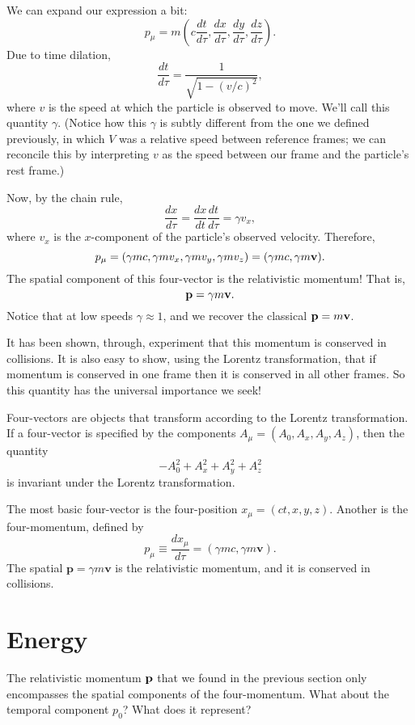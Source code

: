 \documentclass[../p023main.tex]{subfiles}
\begin{document}
We can expand our expression a bit:
\[ p_\mu = m \left( c \frac{dt}{d\tau}, \frac{dx}{d\tau}, \frac{dy}{d\tau}, \frac{dz}{d\tau} \right). \]
Due to time dilation,
\[ \frac{dt}{d\tau} = \frac{1}{\sqrt{1 - \left( v / c \right)^2}}, \]
where $v$ is the speed at which the particle is observed to move.
We'll call this quantity $\gamma$.
(Notice how this $\gamma$ is subtly different from the one we defined previously, in which $V$ was a relative speed between reference frames; we can reconcile this by interpreting $v$ as the speed between our frame and the particle's rest frame.)

Now, by the chain rule,
\[ \frac{dx}{d\tau} = \frac{dx}{dt} \frac{dt}{d\tau} = \gamma v_x, \]
where $v_x$ is the $x$-component of the particle's observed velocity.
Therefore,
\[ p_\mu = (\gamma mc, \gamma mv_x, \gamma mv_y, \gamma mv_z) = (\gamma mc, \gamma m\mathbf{v}). \]
The spatial component of this four-vector is the relativistic momentum!
That is,
\[ \mathbf{p} = \gamma m\mathbf{v}. \]
Notice that at low speeds $\gamma \approx 1$, and we recover the classical $\mathbf{p} = m\mathbf{v}$.

It has been shown, through, experiment that this momentum is conserved in collisions.
It is also easy to show, using the Lorentz transformation, that if momentum is conserved in one frame then it is conserved in all other frames.
So this quantity has the universal importance we seek!

\begin{summary}
    Four-vectors are objects that transform according to the Lorentz transformation. If a four-vector is specified by the components $A_\mu = (A_0, A_x, A_y, A_z)$, then the quantity
    \[ -A_0^2 + A_x^2 + A_y^2 + A_z^2 \]
    is invariant under the Lorentz transformation.

    The most basic four-vector is the four-position $x_\mu = (ct, x, y, z)$. Another is the four-momentum, defined by
    \[ p_\mu \equiv \frac{dx_\mu}{d\tau} = (\gamma mc, \gamma m\mathbf{v}). \]
    The spatial $\mathbf{p} = \gamma m \mathbf{v}$ is the relativistic momentum, and it is conserved in collisions.
\end{summary}

\section{Energy}
The relativistic momentum $\mathbf{p}$ that we found in the previous section only encompasses the spatial components of the four-momentum.
What about the temporal component $p_0$?
What does it represent?
\end{document}
